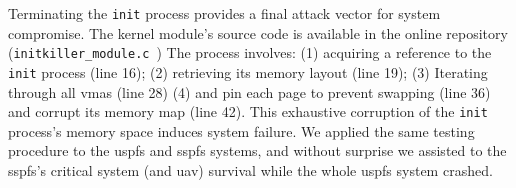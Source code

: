 Terminating the \lstinline{init} process provides a final attack vector for
system compromise.
The kernel module's source code is available in the
online repository (\lstinline{initkiller_module.c}~\cite{thesis-sw-github})
The process involves:
(1) acquiring a reference to the \lstinline{init} process (line 16);
(2) retrieving its memory layout (line 19);
(3) Iterating through all \glspl{vma} (line 28)
(4) and pin each page to prevent swapping (line 36) and corrupt its memory map
(line 42). This exhaustive corruption of the \lstinline{init} process's memory
space induces system failure.
We applied
the same testing procedure to the \gls{uspfs} and \gls{sspfs} systems, and
without surprise we assisted to the \gls{sspfs}'s critical system (and \gls{uav})
survival while the whole \gls{uspfs} system crashed.




